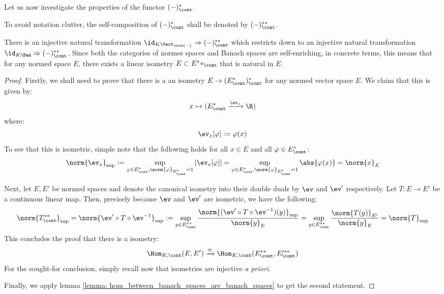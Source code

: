         Let us now investigate the properties of the functor $(-)^*_{\cont}$.
        \begin{convention}
            To avoid notation clutter, the self-composition of $(-)^*_{\cont}$ shall be denoted by $(-)^{**}_{\cont}$.
        \end{convention}
        \begin{lemma} \label{lemma: continuous_double_duals}
            There is an injective natural transformation $\id_{K\-\Vect_{\norm{-}}} \Rightarrow (-)^{**}_{\cont}$ which restricts down to an injective natural transformation $\id_{K\-\Ban} \Rightarrow (-)^{**}_{\cont}$. Since both the categories of normes spaces and Banach spaces are self-enriching, in concrete terms, this means that for any normed space $E$, there exists a linear isometry $E \subset E^**_{\cont}$ that is natural in $E$.
        \end{lemma}
            \begin{proof}
                Firstly, we shall need to prove that there is a an isometry $E \to ( E^*_{\cont} )^*_{\cont}$ for any normed vector space $E$. We claim that this is given by:
                    $$x \mapsto (E^*_{\cont} \xrightarrow[]{\ev_x} \R)$$
                where:
                    $$\ev_x[\varphi] := \varphi(x)$$
                To see that this is isometric, simple note that the following holds for all $x \in E$ and all $\varphi \in E^*_{\cont}$:
                    $$\norm{\ev_x}_{\sup} := \sup_{\varphi \in E^*_{\cont}, \norm{\varphi}_{E^*_{\cont}} = 1} |\ev_x[\varphi]| = \sup_{\varphi \in E^*_{\cont}, \norm{\varphi}_{E^*_{\cont}} = 1} \abs{\varphi(x)} = \norm{x}_E$$

                Next, let $E, E'$ be normed spaces and denote the canonical isometry into their double duals by $\ev$ and $\ev'$ respectively. Let $T: E \to E'$ be a continuous linear map. Then, precisely because $\ev$ and $\ev'$ are isometric, we have the following:
                    $$\norm{ T^{**}_{\cont} }_{\sup} = \norm{ \ev' \circ T \circ \ev^{-1} }_{\sup} := \sup_{y \in E^{**}_{\cont}} \frac{ \norm{ (\ev' \circ T \circ \ev^{-1})(y) }_{\sup} }{\norm{y}_E} = \sup_{y \in E^{**}_{\cont}} \frac{\norm{T(y)}_{E'}}{\norm{y}_E} = \norm{T}_{\sup}$$
                This concludes the proof that there is a isometry:
                    $$\Hom_{K, \cont}(E, E') \xrightarrow[]{\cong} \Hom_{K, \cont}(E^{**}_{\cont}, E'^{**}_{\cont})$$
                For the sought-for conclusion, simply recall now that isometries are injective \textit{a priori}.

                Finally, we apply lemma \ref{lemma: hom_between_banach_spaces_are_banach_spaces} to get the second statement. 
            \end{proof}

